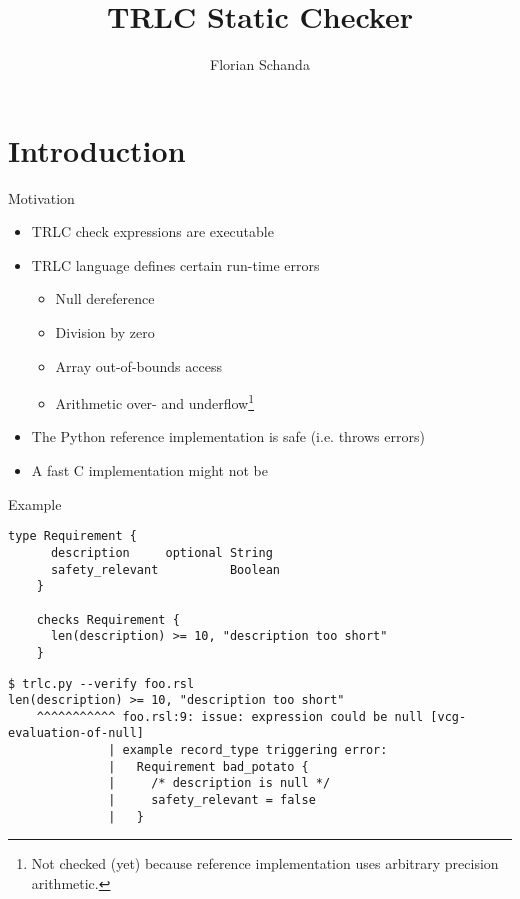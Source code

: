\documentclass[aspectratio=169]{beamer}
\author{Florian Schanda}
\title{TRLC Static Checker}
\begin{document}
\section{Introduction}
\begin{frame}{Motivation}
  \begin{itemize}
  \item TRLC check expressions are executable
  \item TRLC language defines certain run-time errors
    \begin{itemize}
    \item Null dereference
    \item Division by zero
    \item Array out-of-bounds access
    \item Arithmetic over- and underflow\footnote{Not checked (yet)
        because reference implementation uses arbitrary precision
        arithmetic.}
    \end{itemize}
  \item The Python reference implementation is safe (i.e. throws errors)
  \item A fast C implementation might not be
  \end{itemize}
\end{frame}

\begin{frame}[fragile]{Example}
  \begin{lstlisting}[language=TRLC,gobble=4]
    type Requirement {
      description     optional String
      safety_relevant          Boolean
    }

    checks Requirement {
      len(description) >= 10, "description too short"
    }
  \end{lstlisting}
  \pause
  \begin{scriptsize}
\begin{verbatim}
$ trlc.py --verify foo.rsl
len(description) >= 10, "description too short"
    ^^^^^^^^^^^ foo.rsl:9: issue: expression could be null [vcg-evaluation-of-null]
              | example record_type triggering error:
              |   Requirement bad_potato {
              |     /* description is null */
              |     safety_relevant = false
              |   }
\end{verbatim}
  \end{scriptsize}
\end{frame}
\end{document}
